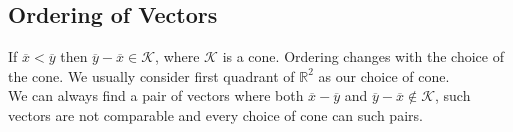 \documentclass{tufte-handout}
\theoremstyle{remark}
\begin{document}
\subsection{Ordering of Vectors}
If $\overline{x} < \overline{y}$ then $\overline{y}-\overline{x} \in \mathcal{K}$, where $\mathcal{K}$ is a cone. Ordering changes with the choice of the cone. We usually consider first quadrant of $\mathbb{R}^2$ as our choice of cone.\\
We can always find a pair of vectors where both $\overline{x}-\overline{y}$ and $\overline{y}-\overline{x} \not\in \mathcal{K}$, such vectors are not comparable and every choice of cone can such pairs.
\end{document}
